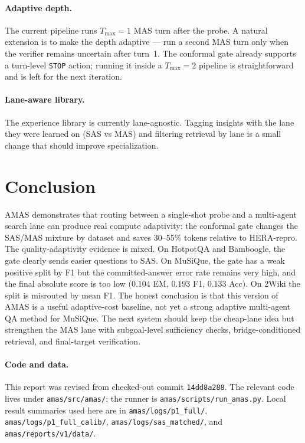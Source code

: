 \documentclass[11pt]{article}
\newcommand{\amas}{AMAS\xspace}
\newcommand{\hera}{HERA\xspace}
\newcommand{\sas}{SAS\xspace}
\newcommand{\mas}{MAS\xspace}
\newcommand{\code}[1]{\texttt{\small #1}}
\begin{document}
\paragraph{Adaptive depth.}
The current pipeline runs $T_{\max}=1$ \mas turn after the probe. A natural
extension is to make the depth adaptive --- run a second \mas turn only
when the verifier remains uncertain after turn~1. The conformal gate
already supports a turn-level \texttt{STOP} action; running it inside a
$T_{\max}=2$ pipeline is straightforward and is left for the next
iteration.

\paragraph{Lane-aware library.}
The experience library is currently lane-agnostic. Tagging insights with the
lane they were learned on (\sas vs \mas) and filtering retrieval by lane is
a small change that should improve specialization.

\section{Conclusion}

\amas demonstrates that routing between a single-shot probe and a
multi-agent search lane can produce real compute adaptivity: the conformal
gate changes the \sas/\mas mixture by dataset and saves 30--55\% tokens
relative to \hera-repro. The quality-adaptivity evidence is mixed. On
HotpotQA and Bamboogle, the gate clearly sends easier questions to \sas. On
MuSiQue, the gate has a weak positive split by F1 but the committed-answer
error rate remains very high, and the final absolute score is too low
($0.104$ EM, $0.193$ F1, $0.133$ Acc). On 2Wiki the split is misrouted by
mean F1. The honest conclusion is that this version of \amas is a useful
adaptive-cost baseline, not yet a strong adaptive multi-agent QA method for
MuSiQue. The next system should keep the cheap-lane idea but strengthen the
\mas lane with subgoal-level sufficiency checks, bridge-conditioned
retrieval, and final-target verification.

\paragraph{Code and data.}
This report was revised from checked-out commit \code{14dd8a288}. The relevant code lives
under \code{amas/src/amas/}; the runner is \code{amas/scripts/run\_amas.py}.
Local result summaries used here are in \code{amas/logs/p1\_full/},
\code{amas/logs/p1\_full\_calib/}, \code{amas/logs/sas\_matched/}, and
\code{amas/reports/v1/data/}.
\end{document}
